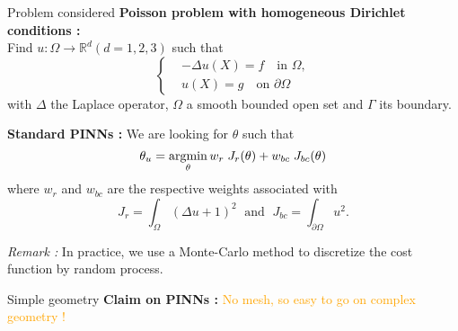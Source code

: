 \begin{frame}{Problem considered}
    \textbf{Poisson problem with homogeneous Dirichlet conditions :} \\
    Find $u : \Omega \rightarrow \mathbb{R}^d (d=1,2,3)$ such that
    \begin{equation*}
    	\left\{\begin{aligned}
    		&-\Delta u(X) = f \quad \text{in } \Omega, \\
    		&u(X) = g \quad \text{on } \partial \Omega
    	\end{aligned}\right. \label{edp}
    \end{equation*}
	with $\Delta$ the Laplace operator, $\Omega$ a smooth bounded open set and $\Gamma$ its boundary.
	
	\textbf{Standard PINNs :} We are looking for $\theta$ such that
	\begin{equation*}
		\theta_u = \operatorname*{argmin}_{\theta} w_{r}\; J_{r}(\theta)+w_{bc}\; J_{bc}(\theta)
	\end{equation*}
	where $w_{r}$ and $w_{bc}$ are the respective weights associated with
	\begin{equation*}
		J_{r} = \int_\Omega (\Delta u+1)^2 \; \text{ and } \; J_{bc} = \int_{\partial\Omega} u^2.
	\end{equation*}	
	
	\footnotesize
	\textit{Remark :} In practice, we use a Monte-Carlo method to discretize the cost function by random process.
\end{frame}

\begin{frame}{Simple geometry}
	\textbf{Claim on PINNs :} \textcolor{orange}{No mesh, so easy to go on complex geometry !}
	
	\centering
\end{frame}

